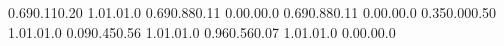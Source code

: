 \documentclass[a5paper,9pt]{scrreprt}
\begin{document}
\thispagestyle{empty}

\setslotsize{4.44cm}{0.203cm}
\settextframe{0.8mm}

\seteventcornerradius{0pt}


  {0.69}{0.11}{0.20}   {1.0}{1.0}{1.0}  %
  {0.69}{0.88}{0.11}   {0.0}{0.0}{0.0}  %
 {0.69}{0.88}{0.11}   {0.0}{0.0}{0.0}  %
 {0.35}{0.00}{0.50}   {1.0}{1.0}{1.0}  %
     {0.09}{0.45}{0.56}   {1.0}{1.0}{1.0}  %
 {0.96}{0.56}{0.07}   {1.0}{1.0}{1.0}  %
   {0.0}{0.0}{0.0}  %
\end{document}
